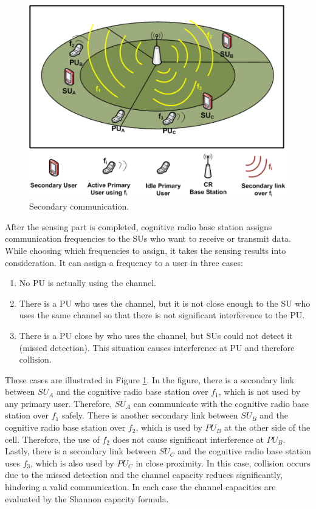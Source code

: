 \documentclass[conference,compsoc]{IEEEtran}
\newcommand{\CR}{cognitive radio }
\begin{document}
\begin{figure}[!ht]
\centering
\includegraphics[width=0.99\columnwidth,keepaspectratio] {figs/communicationCases.eps}
\caption{Secondary communication.} \label{fig:network}
\end{figure}

After the sensing part is completed, \CR base station assigns communication frequencies to the SUs who want to receive or transmit data. While choosing which frequencies to assign, it takes the sensing results into consideration. It can assign a frequency to a user in three cases:
\begin{enumerate}
\item No PU is actually using the channel.
\item There is a PU who uses the channel, but it is not close enough to the SU who uses the same channel so that there is not significant interference to the PU.
\item There is a PU close by who uses the channel, but SUs could not detect it (missed detection). This situation causes interference at PU and therefore collision.
\end{enumerate}

These cases are illustrated in Figure \ref{fig:network}. In the figure, there is a secondary link between $SU_A$ and the \CR base station over $f_1$, which is not used by any primary user. Therefore, $SU_A$ can communicate with the \CR base station over $f_1$ safely. There is another secondary link between $SU_B$ and the \CR base station over $f_2$, which is used by $PU_B$ at the other side of the cell. Therefore, the use of $f_2$ does not cause significant interference at $PU_B$. Lastly, there is a secondary link between $SU_C$ and the \CR base station uses $f_3$, which is also used by $PU_C$ in close proximity. In this case, collision occurs due to the missed detection and the channel capacity reduces significantly, hindering a valid communication. In each case the channel capacities are evaluated by the Shannon capacity formula.
\end{document}
